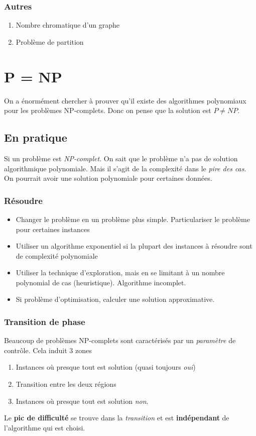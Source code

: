 \documentclass{report}
\begin{document}
\subsubsection{Autres}
\begin{enumerate}
\item Nombre chromatique d'un graphe
\item Problème de partition
\end{enumerate}


\section{P = NP}
On a énormément chercher à prouver qu'il existe des algorithmes polynomiaux pour les problèmes NP-complets. Donc on pense que la solution est $P \neq NP$.

\subsection{En pratique}
Si un problème est \textit{NP-complet}. On sait que le problème n'a pas de solution algorithmique polynomiale. Mais il s'agit de la complexité dans le \textit{pire des cas}. On pourrait avoir une solution polynomiale pour certaines données.

\subsubsection{Résoudre}
\begin{itemize}
\item Changer le problème en un problème plus simple. Particulariser le problème
pour certaines instances
\item  Utiliser un algorithme exponentiel si la plupart des instances à résoudre sont
de complexité polynomiale
\item  Utiliser la technique d'exploration, mais en se limitant à un nombre polynomial
de cas (heuristique). Algorithme incomplet.
\item  Si problème d'optimisation, calculer une solution approximative.
\end{itemize}

\subsubsection{Transition de phase}
Beaucoup de problèmes NP-complets sont caractérisés par un \textit{paramètre} de contrôle. Cela induit 3 zones
\begin{enumerate}
\item Instances où presque tout est solution (quasi toujours \textit{oui})
\item Transition entre les deux régions
\item Instances où presque tout est solution \textit{non}.
\end{enumerate}
Le \textbf{pic de difficulté} se trouve dans la \textit{transition} et est \textbf{indépendant} de l'algorithme qui est choisi.
\end{document}
